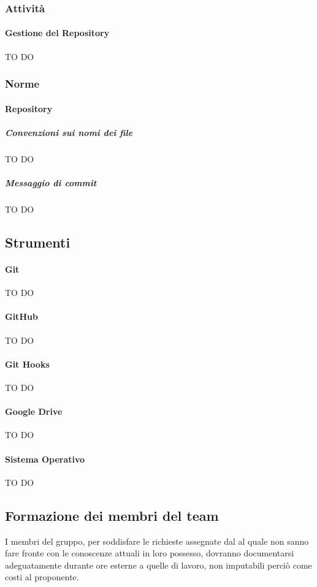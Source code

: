 		\subsubsection{Attività}
			\paragraph{Gestione del Repository}
TO DO			
		\subsubsection{Norme}
			\paragraph{Repository}
				\subparagraph{Convenzioni sui nomi dei file}
TO DO				
				\subparagraph{Messaggio di commit}
TO DO		
			
		\subsection{Strumenti}
			\paragraph{Git}
TO DO			
			\paragraph{GitHub}
TO DO			
			\paragraph{Git Hooks}
TO DO
			\paragraph{Google Drive}
TO DO
			\paragraph{Sistema Operativo}
TO DO





	\subsection{Formazione dei membri del team}
I membri del gruppo, per soddisfare le richieste assegnate dal \roleProjectManager{} al quale non sanno fare fronte con le conoscenze attuali in loro possesso, dovranno documentarsi adeguatamente durante ore esterne a quelle di lavoro, non imputabili perciò come costi al proponente.